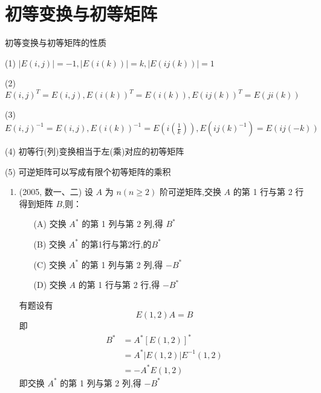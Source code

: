 \documentclass[12pt, a4paper, oneside, UTF8]{ctexbook}
\begin{document}
\section{初等变换与初等矩阵}
\begin{remark}
    初等变换与初等矩阵的性质
    \item [(1)] $\left|E(i,j)\right|=-1,\left|E(i(k))\right|=k,\left|E(ij(k))\right|=1$
    \item [(2)] $E(i, j)^T=E(i,j),E(i(k))^T=E(i(k)),E(ij(k))^T=E(ji(k))$
    \item [(3)] $E(i,j)^{-1}=E(i,j),E(i(k))^{-1}=E(i(\frac{1}{k})),E(ij(k)^{-1})=E(ij(-k))$
    \item [(4)] 初等行(列)变换相当于左(乘)对应的初等矩阵
    \item [(5)] 可逆矩阵可以写成有限个初等矩阵的乘积
\end{remark}
\begin{enumerate}[label=\arabic*.,start=11]
    \item (2005, 数一、二) 设 $ A $ 为 $ n(n \geq 2) $ 阶可逆矩阵,交换 $ A $ 的第 1 行与第 2 行得到矩阵 $ B $,则：
    \begin{enumerate}
        \item [(A)] 交换 $ A^* $ 的第 1 列与第 2 列,得 $ B^* $
        \item [(B)] 交换 $ A^* $ 的第1行与第2行,的$B^*$
        \item [(C)] 交换 $ A^* $ 的第 1 列与第 2 列,得 $ -B^* $
        \item [(D)] 交换 $ A $ 的第 1 行与第 2 行,得 $ -B^* $
    \end{enumerate}
    
    \begin{solution}
    有题设有
    $$
        E(1,2)A = B 
    $$
    即
    \begin{align*}
        B^* &= A^*\left[E(1,2)\right]^* \\
        &=A^*\left|E(1,2)\right|E^{-1}(1,2) \\
        &=-A^*E(1,2)
    \end{align*}
    即交换 $ A^* $ 的第 1 列与第 2 列,得 $ -B^* $
    \end{solution}
\end{enumerate}

\ifx\allfiles\undefined
\end{document}
